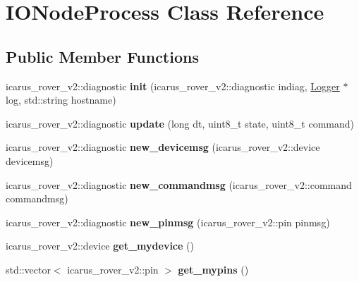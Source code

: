 \hypertarget{classIONodeProcess}{}\section{I\+O\+Node\+Process Class Reference}
\label{classIONodeProcess}
\subsection*{Public Member Functions}
\begin{DoxyCompactItemize}
\item 
\mbox{\label{classIONodeProcess_a6dbd95b713b32ff4e271cf737e298499}} 
icarus\+\_\+rover\+\_\+v2\+::diagnostic {\bfseries init} (icarus\+\_\+rover\+\_\+v2\+::diagnostic indiag, \hyperlink{classLogger}{Logger} $\ast$log, std\+::string hostname)
\item 
\mbox{\label{classIONodeProcess_a45bb372daa02ac567b29bb156c56c69e}} 
icarus\+\_\+rover\+\_\+v2\+::diagnostic {\bfseries update} (long dt, uint8\+\_\+t state, uint8\+\_\+t command)
\item 
\mbox{\label{classIONodeProcess_a8bee390d89a1aa5e9481f7a69928f789}} 
icarus\+\_\+rover\+\_\+v2\+::diagnostic {\bfseries new\+\_\+devicemsg} (icarus\+\_\+rover\+\_\+v2\+::device devicemsg)
\item 
\mbox{\label{classIONodeProcess_a9a23df211c6cd666be98637901233169}} 
icarus\+\_\+rover\+\_\+v2\+::diagnostic {\bfseries new\+\_\+commandmsg} (icarus\+\_\+rover\+\_\+v2\+::command commandmsg)
\item 
\mbox{\label{classIONodeProcess_a8f97c3166473df0ec78ce0341abad8a2}} 
icarus\+\_\+rover\+\_\+v2\+::diagnostic {\bfseries new\+\_\+pinmsg} (icarus\+\_\+rover\+\_\+v2\+::pin pinmsg)
\item 
\mbox{\label{classIONodeProcess_aaba7abd28662c89597ffb66cbae10d61}} 
icarus\+\_\+rover\+\_\+v2\+::device {\bfseries get\+\_\+mydevice} ()
\item 
\mbox{\label{classIONodeProcess_a844e50c4b1e6a4d5e955ee9a168b767e}} 
std\+::vector$<$ icarus\+\_\+rover\+\_\+v2\+::pin $>$ {\bfseries get\+\_\+mypins} ()

\end{DoxyCompactItemize}
